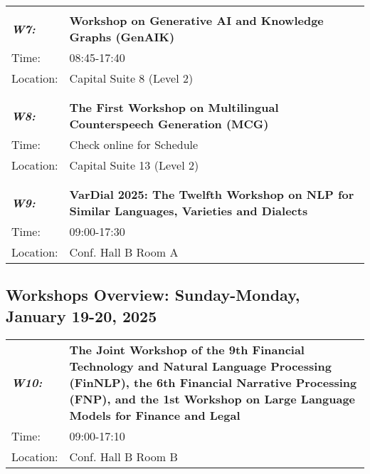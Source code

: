 \begin{longtable}{p{15mm}p{100mm}}
\hline\\
\emph{\textbf{W7:}} & \textbf{Workshop on Generative AI and Knowledge Graphs (GenAIK)} \\
Time: & 08:45-17:40 \\
Location: & Capital Suite 8 (Level 2) \\\\
\hline\\
\emph{\textbf{W8:}} & \textbf{The First Workshop on Multilingual Counterspeech Generation (MCG)} \\
Time: & Check online for Schedule \\
Location: & Capital Suite 13 (Level 2) \\\\
\hline\\
\emph{\textbf{W9:}} & \textbf{VarDial 2025: The Twelfth Workshop on NLP for Similar Languages, Varieties and Dialects} \\
Time: & 09:00-17:30 \\
Location: & Conf. Hall B Room A \\
\end{longtable}

\subsection{Workshops Overview: Sunday-Monday, January 19-20, 2025}
\begin{longtable}{p{15mm}p{100mm}}
\emph{\textbf{W10:}} & \textbf{The Joint Workshop of the 9th Financial Technology and Natural Language Processing (FinNLP), the 6th Financial Narrative Processing (FNP), and the 1st Workshop on Large Language Models for Finance and Legal} \\
Time: & 09:00-17:10\\
Location: & Conf. Hall B Room B \\
\end{longtable}

